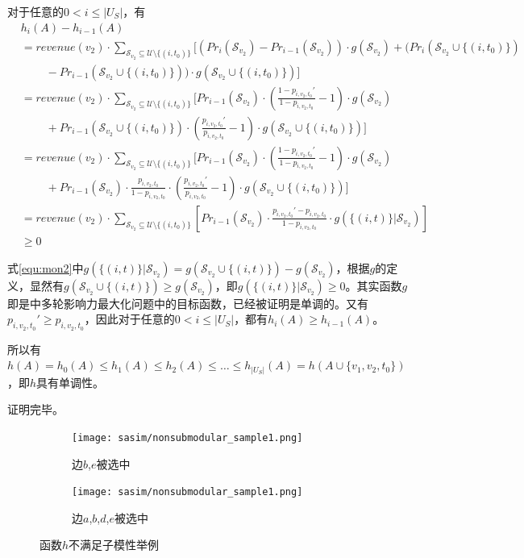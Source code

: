 对于任意的$0<i\le |U_S|$，有
\begin{align}
    &h_i(A)-h_{i-1}(A)\\
    &=revenue(v_2)\cdot \sum_{\mathcal{S}_{v_2}\subseteq \mathcal{U}\setminus \{(i,t_0)\}}[(Pr_i(\mathcal{S}_{v_2})-Pr_{i-1}(\mathcal{S}_{v_2}))\cdot g(\mathcal{S}_{v_2}) + (Pr_i(\mathcal{S}_{v_2}\cup \{(i,t_0)\}) \\
    &\ \ \ \ \ \ \ \ \ \ -Pr_{i-1}(\mathcal{S}_{v_2}\cup \{(i,t_0)\}))\cdot g(\mathcal{S}_{v_2}\cup \{(i,t_0)\})] \\ 
    &=revenue(v_2)\cdot \sum_{\mathcal{S}_{v_2}\subseteq \mathcal{U}\setminus \{(i,t_0)\}}[Pr_{i-1}(\mathcal{S}_{v_2})\cdot\left(\frac{1-p_{i,v_2,t_0}'}{1-p_{i,v_2,t_0}}-1\right) \cdot g(\mathcal{S}_{v_2}) \\ 
    &\ \ \ \ \ \ \ \ \ \ + Pr_{i-1}(\mathcal{S}_{v_2}\cup \{(i,t_0)\})\cdot (\frac{p_{i,v_2,t_0}'}{p_{i,v_2,t_0}}-1)\cdot g(\mathcal{S}_{v_2}\cup \{(i,t_0)\}) ]  \\ 
    &=revenue(v_2)\cdot \sum_{\mathcal{S}_{v_2}\subseteq \mathcal{U}\setminus \{(i,t_0)\}}[Pr_{i-1}(\mathcal{S}_{v_2})\cdot\left(\frac{1-p_{i,v_2,t_0}'}{1-p_{i,v_2,t_0}}-1\right) \cdot g(\mathcal{S}_{v_2}) \\ 
    &\ \ \ \ \ \ \ \ \ \ + Pr_{i-1}(\mathcal{S}_{v_2})\cdot\frac{p_{i,v_2,t_0}}{1-p_{i,v_2,t_0}}\cdot (\frac{p_{i,v_2,t_0}'}{p_{i,v_2,t_0}}-1)\cdot g(\mathcal{S}_{v_2}\cup \{(i,t_0)\}) ] \\
    &=revenue(v_2)\cdot \sum_{\mathcal{S}_{v_2}\subseteq \mathcal{U}\setminus \{(i,t_0)\}}[Pr_{i-1}(\mathcal{S}_{v_2})\cdot\frac{p_{i,v_2,t_0}'-p_{i,v_2,t_0}}{1-p_{i,v_2,t_0}} \cdot g(\{(i,t)\} |\mathcal{S}_{v_2})] \label{equ:mon2} \\ 
    &\ge 0 
\end{align}

\noindent 式\ref{equ:mon2}中$g(\{(i,t)\} |\mathcal{S}_{v_2})=g(\mathcal{S}_{v_2}\cup\{(i,t)\})-g(\mathcal{S}_{v_2})$，根据$g$的定义，显然有$g(\mathcal{S}_{v_2}\cup\{(i,t)\})\ge g(\mathcal{S}_{v_2})$，即$g(\{(i,t)\} |\mathcal{S}_{v_2}) \ge 0$。其实函数$g$即是\parencite{mrim}中多轮影响力最大化问题中的目标函数，已经被证明是单调的。又有$p_{i,v_2,t_0}'\ge p_{i,v_2,t_0}$，因此对于任意的$0<i\le |U_S|$，都有$h_i(A) \ge h_{i-1}(A)$。

所以有$h(A)=h_0(A) \le h_1(A) \le h_2(A) \le \ldots \le h_{|U_S|}(A)=h(A \cup\{v_1,v_2,t_0\})$，即$h$具有单调性。

证明完毕。

\begin{figure}[htbp]
    \centering
    \begin{subfigure}[t]{0.44\linewidth}
        \centering
        \texttt{[image: sasim/nonsubmodular\_sample1.png]}
        \caption{边$b$,$e$被选中\label{fig:nonsub_a}}
    \end{subfigure}
    \quad
    \begin{subfigure}[t]{0.44\linewidth}
        \centering
        \texttt{[image: sasim/nonsubmodular\_sample1.png]}
        \caption{边$a$,$b$,$d$,$e$被选中\label{fig:nonsub_b}}
    \end{subfigure}

    \caption{\label{fig:nonsub_sample}函数$h$不满足子模性举例}
\end{figure}


